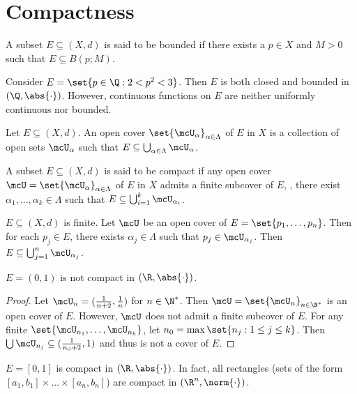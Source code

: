 \section{Compactness} \label{sec:compactness}
\begin{definition} \label{def:bounded}
    A subset $E \subseteq (X, d)$ is said to be bounded if there exists a
    $p \in X$ and $M > 0$ such that $E \subseteq B(p; M)$.
\end{definition}

Consider $E = \set{p \in \Q : 2 < p^2 < 3}$.
Then $E$ is both closed and bounded in $(\Q, \abs{\cdot})$.
However, continuous functions on $E$ are neither uniformly continuous nor
bounded.

\begin{definition} \label{def:open_cover}
    Let $E \subseteq (X, d)$.
    An open cover $\set{\mcU_\alpha}_{\alpha \in \Lambda}$ of $E$ in $X$ is
    a collection of open sets $\mcU_\alpha$ such that
    $E \subseteq \bigcup_{\alpha \in \Lambda} \mcU_\alpha$.
\end{definition}

\begin{definition} \label{def:compact}
    A subset $E \subseteq (X, d)$ is said to be compact if any open cover
    $\mcU = \set{\mcU_\alpha}_{\alpha \in \Lambda}$ of $E$ in $X$ admits a
    finite subcover of $E$, \ie, there exist
    $\alpha_1, \dots, \alpha_k \in \Lambda$ such that $E \subseteq
    \bigcup_{i = 1}^k \mcU_{\alpha_i}$.
\end{definition}

\begin{examples}
    \item $E \subseteq (X, d)$ is finite.
    Let $\mcU$ be an open cover of $E = \set{p_1, \dots, p_n}$.
    Then for each $p_j \in E$, there exists $\alpha_j \in \Lambda$ such that
    $p_j \in \mcU_{\alpha_j}$.
    Then $E \subseteq \bigcup_{j = 1}^n \mcU_{\alpha_j}$.
    \item $E = (0, 1)$ is not compact in $(\R, \abs{\cdot})$.
    \begin{proof}
        Let $\mcU_n = (\frac1{n+2}, \frac1n)$ for $n \in \N^*$.
        Then $\mcU = \set{\mcU_n}_{n \in \N^*}$ is an open cover of $E$.
        However, $\mcU$ does not admit a finite subcover of $E$.
        For any finite $\set{\mcU_{n_1}, \dots, \mcU_{n_k}}$, let
        $n_0 = \max\set{n_j : 1 \le j \le k}$.
        Then $\bigcup \mcU_{n_j} \subseteq (\frac1{n_0 + 2}, 1)$ and thus is
        not a cover of $E$.
    \end{proof}
    \item $E = [0, 1]$ is compact in $(\R, \abs{\cdot})$.
    In fact, all rectangles (sets of the form
    $[a_1, b_1] \times \dots \times [a_n, b_n]$) are compact in
    $(\R^n, \norm{\cdot})$.
\end{examples}

